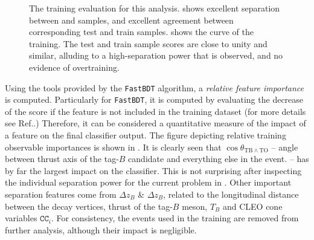\begin{figure}[htbp!]
    \centering
    \caption{\label{fig:training_evaluation} The training evaluation for this analysis.
     shows excellent separation between \epem\ra\qqbar and \BtoXsgamma samples, and excellent agreement between corresponding test and train samples.
     shows the \ROC curve of the training. 
    The test and train sample \AUC scores are close to unity and similar, alluding to a high-separation power that is observed, and no evidence of overtraining.
    }
\end{figure}

Using the tools provided by the \texttt{FastBDT} algorithm, a \textit{relative feature importance} is computed.
Particularly for \texttt{FastBDT}, it is computed by evaluating the decrease of the \AUC score if the feature is not included in the training dataset (for more details see Ref.\cite{Keck:2017gsv}.)
Therefore, it can be considered a quantitative measure of the impact of a feature on the final classifier output.
The figure depicting relative training observable importances is shown in . 
It is clearly seen that $\cos\theta_{\mathrm{TB}\wedge\mathrm{TO}}$ -- angle between thrust axis of the tag-$B$ candidate and everything else in the event. 
-- has by far the largest impact on the classifier.
This is not surprising after inspecting the individual separation power for the current problem in .
Other important separation features come from  $\Delta z_B$ \&  $\Delta z_B$, related to the longitudinal distance between the decay vertices,
thrust of the tag-$B$ meson, $T_B$ and CLEO cone variables $\mathtt{CC}_i$. 
For consistency, the events used in the training are removed from further analysis, although their impact is negligible.

